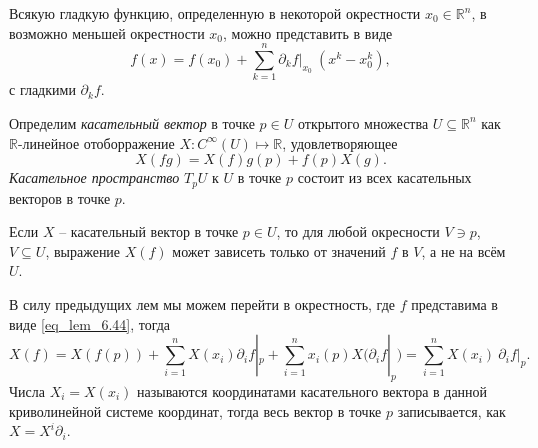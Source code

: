 


\begin{to_lem} 
    Всякую гладкую функцию, определенную в некоторой окрестности $x_0 \in \mathbb{R}^n$, в возможно меньшей окрестности $x_0$, можно представить в виде
    \begin{equation}
    \label{eq_lem_6.44}
         f(x) = f(x_0) + \sum_{k=1}^n \partial_k f|_{x_0}
         \
         (x^k  - x_0^k) , 
     \end{equation} 
     с гладкими $\partial_k f$.
\end{to_lem}


\begin{to_def} 
    Определим \textit{касательный вектор} в точке $p \in U$ открытого множества $U \subseteq \mathbb{R}^n$ как $\mathbb{R}$-линейное отоборражение $X \colon C^{\infty}(U) \mapsto \mathbb{R}$, удовлетворяющее 
    \begin{equation*}
        X(fg) = X(f) g(p) + f(p) X(g).
    \end{equation*}
    \textit{Касательное пространство} $T_p U$ к $U$ в точке $p$ состоит из всех касательных векторов в точке $p$.
\end{to_def}

\begin{to_lem} 
    Если $X$ -- касательный вектор в точке $p \in U$, то для любой окресности $V \ni p$, $V \subseteq U$, выражение $X(f)$ может зависеть только от значений $f$ в $V$, а не на всём $U$. 
\end{to_lem}

В силу предыдущих лем мы можем перейти в окрестность, где $f$ представима в виде \eqref{eq_lem_6.44}, тогда
\begin{equation*}
    X(f) = X(f(p)) + \sum_{i=1}^n X(x_i) \partial_i f|_p + \sum_{i=1}^n x_i(p) X(\partial_i f|_p) = 
    \sum_{i=1}^n X(x_i) \ \partial_i f|_p.
\end{equation*}
Числа $X_i = X(x_i)$ называются координатами касательного вектора в данной криволинейной системе координат, тогда весь вектор в точке $p$ записывается, как $X = X^i \partial_i$.

